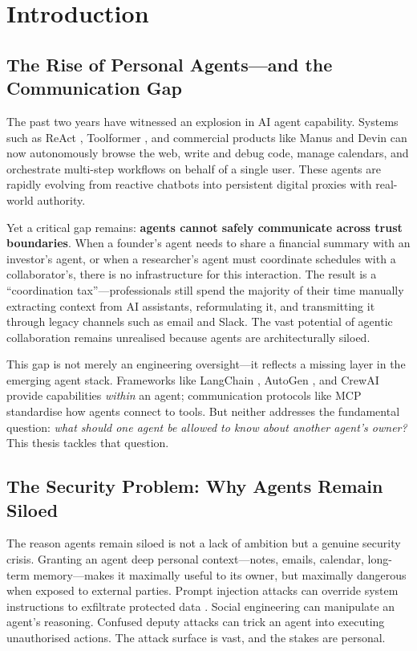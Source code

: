 \chapter{Introduction}
\label{chapter:introduction}

\section{The Rise of Personal Agents---and the Communication Gap}

The past two years have witnessed an explosion in AI agent capability. Systems such as ReAct \cite{yao2023react}, Toolformer \cite{schick2023toolformer}, and commercial products like Manus \cite{manus2025} and Devin \cite{devin2024} can now autonomously browse the web, write and debug code, manage calendars, and orchestrate multi-step workflows on behalf of a single user. These agents are rapidly evolving from reactive chatbots into persistent digital proxies with real-world authority.

Yet a critical gap remains: \textbf{agents cannot safely communicate across trust boundaries}. When a founder's agent needs to share a financial summary with an investor's agent, or when a researcher's agent must coordinate schedules with a collaborator's, there is no infrastructure for this interaction. The result is a ``coordination tax''---professionals still spend the majority of their time manually extracting context from AI assistants, reformulating it, and transmitting it through legacy channels such as email and Slack. The vast potential of agentic collaboration remains unrealised because agents are architecturally siloed.

This gap is not merely an engineering oversight---it reflects a missing layer in the emerging agent stack. Frameworks like LangChain \cite{langchain2023}, AutoGen \cite{wu2023autogen}, and CrewAI provide capabilities \textit{within} an agent; communication protocols like MCP \cite{anthropic2024mcp} standardise how agents connect to tools. But neither addresses the fundamental question: \textit{what should one agent be allowed to know about another agent's owner?} This thesis tackles that question.

\section{The Security Problem: Why Agents Remain Siloed}

The reason agents remain siloed is not a lack of ambition but a genuine security crisis. Granting an agent deep personal context---notes, emails, calendar, long-term memory---makes it maximally useful to its owner, but maximally dangerous when exposed to external parties. Prompt injection attacks can override system instructions to exfiltrate protected data \cite{greshake2023not}. Social engineering can manipulate an agent's reasoning. Confused deputy attacks can trick an agent into executing unauthorised actions. The attack surface is vast, and the stakes are personal.

